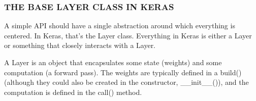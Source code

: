 \subsubsection*{THE BASE LAYER CLASS IN KERAS}
A simple API should have a single abstraction around which everything is centered. In Keras, that's the Layer class. Everything in Keras is either a Layer or something that closely interacts with a Layer.

A Layer is an object that encapsulates some state (weights) and some computation (a forward pass). The weights are typically defined in a build() (although they could also be created in the constructor, \_\_init\_\_()), and the computation is defined in the call() method.